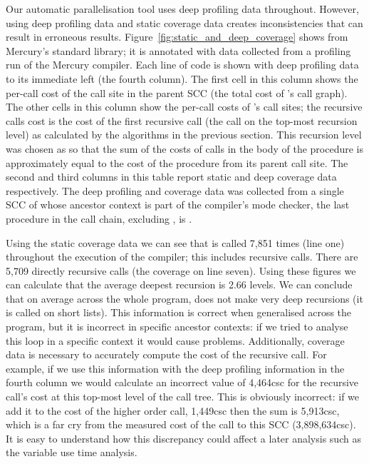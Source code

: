 Our automatic parallelisation tool uses deep profiling data throughout.
However, using deep profiling data and static coverage data creates
inconsistencies that can result in erroneous results.
Figure~\ref{fig:static_and_deep_coverage} shows \listfoldlthree from
Mercury's standard library;
it is annotated with data collected from a profiling run of the Mercury
compiler.
Each line of code is shown with deep profiling data to its immediate left
(the fourth column).
The first cell in this column shows the per-call cost of the
call site in the parent SCC (the total cost of \foldlthree's call graph).
The other cells in this column show the per-call costs of \foldlthree's call
sites;
the recursive calls cost is the cost of the first recursive call
(the call on the top-most recursion level)
as calculated by the algorithms in the previous section.
This recursion level was chosen as so that the sum of the costs of calls in
the body of the procedure is approximately equal to the cost of the procedure
from its parent call site.
The second and third columns in this table report static and deep coverage
data respectively.
The deep profiling and coverage data was collected from a single SCC of
\foldlthree whose ancestor context  is part of the compiler's mode checker,
the last procedure in the call chain, excluding \foldlthree, is
.

Using the static coverage data we can see that \foldlthree is called 7,851 times
(line one)
throughout the execution of the compiler;
this includes recursive calls.
There are 5,709 directly recursive calls (the coverage on line seven).
Using these figures we can calculate that the average deepest recursion is
2.66 levels.
We can conclude that on average across the whole program,
\foldlthree does not make very deep recursions
(it is called on short lists).
This information is correct when generalised across the program,
but it is incorrect in specific ancestor contexts:
if we tried to analyse this loop in a specific context it would cause
problems.
Additionally, coverage data is necessary to accurately compute the cost of
the recursive call.
For example,
if we use this information with the deep profiling information in the fourth
column we would calculate an incorrect value of 4,464csc for the recursive
call's cost at this top-most level of the call tree.
This is obviously incorrect:
if we add it to the cost of the higher order call, 1,449csc
then the sum is 5,913csc,
which is a far cry from the measured cost of the call to this SCC
(3,898,634csc).
It is easy to understand how this discrepancy could affect a later analysis
such as the variable use time analysis.

